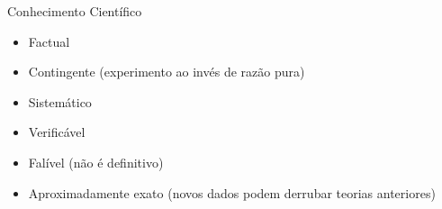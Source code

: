 \documentclass{beamer}
\begin{document}




\begin{frame}{Conhecimento Científico}
  \begin{itemize}
  \item Factual
  \item Contingente (\alert{experimento} ao invés de razão pura)
  \item Sistemático 
  \item \alert{Verificável}
  \item Falível (não é definitivo)
  \item Aproximadamente exato (novos dados podem derrubar teorias
    anteriores)
  \end{itemize}
\end{frame}
\end{document}
